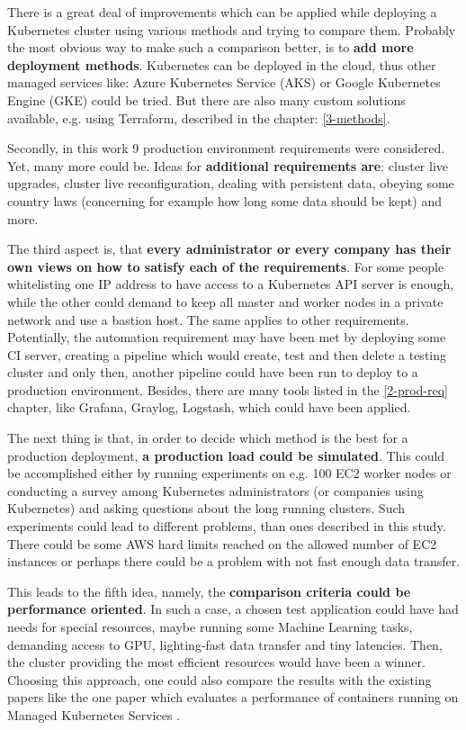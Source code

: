 There is a great deal of improvements which can be applied while deploying a Kubernetes cluster using various methods and trying to compare them. Probably the most obvious way to make such a comparison better, is to \textbf{add more deployment methods}. Kubernetes can be deployed in the cloud, thus other managed services like: Azure Kubernetes Service (AKS) or Google Kubernetes Engine (GKE) could be tried. But there are also many custom solutions available, e.g. using Terraform, described in the chapter: \ref{3-methods}.

Secondly, in this work 9 production environment requirements were considered. Yet, many more could be. Ideas for \textbf{additional requirements are}: cluster live upgrades, cluster live reconfiguration, dealing with persistent data, obeying some country laws (concerning for example how long some data should be kept) and more.

The third aspect is, that \textbf{every administrator or every company has their own views on how to satisfy each of the requirements}. For some people whitelisting one IP address to have access to a Kubernetes API server is enough, while the other could demand to keep all master and worker nodes in a private network and use a bastion host. The same applies to other requirements. Potentially, the automation requirement may have been met by deploying some CI server, creating a pipeline which would create, test and then delete a testing cluster and only then, another pipeline could have been run to deploy to a production environment. Besides, there are many tools listed in the \ref{2-prod-req} chapter, like Grafana, Graylog, Logstash, which could have been applied.

The next thing is that, in order to decide which method is the best for a production deployment, \textbf{a production load could be simulated}. This could be accomplished either by running experiments on e.g. 100 EC2 worker nodes or conducting a survey among Kubernetes administrators (or companies using Kubernetes) and asking questions about the long running clusters. Such experiments could lead to different problems, than ones described in this study. There could be some AWS hard limits reached on the allowed number of EC2 instances or perhaps there could be a problem with not fast enough data transfer.

This leads to the fifth idea, namely, the \textbf{comparison criteria could be performance oriented}. In such a case, a chosen test application could have had needs for special resources, maybe running some Machine Learning tasks, demanding access to GPU, lighting-fast data transfer and tiny latencies. Then, the cluster providing the most efficient resources would have been a winner. Choosing this approach, one could also compare the results with the existing papers like the one paper which evaluates a performance of containers running on Managed Kubernetes Services \cite{article-managed}.

